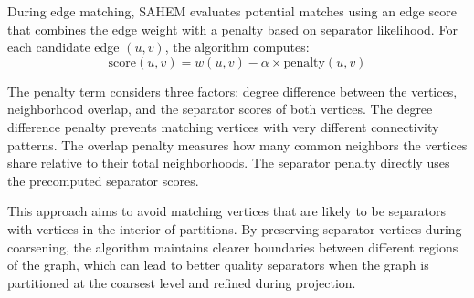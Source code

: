During edge matching, SAHEM evaluates potential matches using an edge score that combines the edge weight with a penalty based on separator likelihood. For each candidate edge $(u,v)$, the algorithm computes:
\[
\text{score}(u,v) = w(u,v) - \alpha \times \text{penalty}(u,v)
\]

The penalty term considers three factors: degree difference between the vertices, neighborhood overlap, and the separator scores of both vertices. The degree difference penalty prevents matching vertices with very different connectivity patterns. The overlap penalty measures how many common neighbors the vertices share relative to their total neighborhoods. The separator penalty directly uses the precomputed separator scores.

This approach aims to avoid matching vertices that are likely to be separators with vertices in the interior of partitions. By preserving separator vertices during coarsening, the algorithm maintains clearer boundaries between different regions of the graph, which can lead to better quality separators when the graph is partitioned at the coarsest level and refined during projection.

